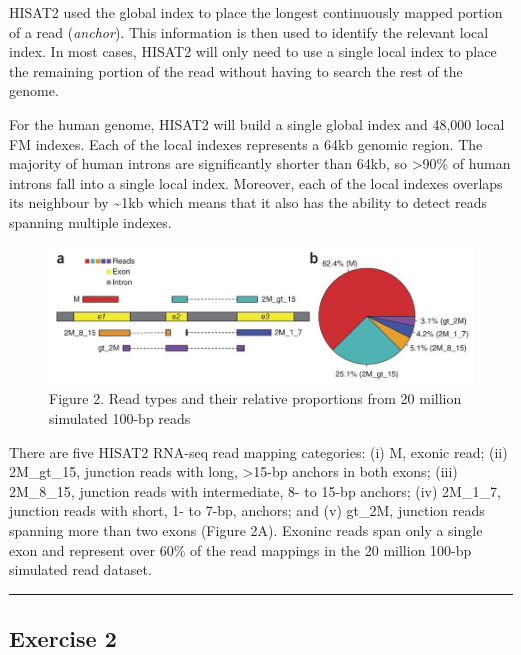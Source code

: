 \documentclass[11pt]{article}
\begin{document}
HISAT2 used the global index to place the longest continuously mapped
portion of a read (\textit{anchor}). This information is then used to
identify the relevant local index. In most cases, HISAT2 will only need
to use a single local index to place the remaining portion of the read
without having to search the rest of the genome.

For the human genome, HISAT2 will build a single global index and 48,000
local FM indexes. Each of the local indexes represents a 64kb genomic
region. The majority of human introns are significantly shorter than
64kb, so \textgreater90\% of human introns fall into a single local
index. Moreover, each of the local indexes overlaps its neighbour by
\textasciitilde1kb which means that it also has the ability to detect
reads spanning multiple indexes.

    \begin{figure}[!h]
\centering
\includegraphics{images/split-reads.png}
\caption{Figure 2. Read types and their relative proportions from 20
million simulated 100-bp reads}
\end{figure}

    There are five HISAT2 RNA-seq read mapping categories: (i) M, exonic
read; (ii) 2M\_gt\_15, junction reads with long, \textgreater15-bp
anchors in both exons; (iii) 2M\_8\_15, junction reads with
intermediate, 8- to 15-bp anchors; (iv) 2M\_1\_7, junction reads with
short, 1- to 7-bp, anchors; and (v) gt\_2M, junction reads spanning more
than two exons (Figure 2A). Exoninc reads span only a single exon and
represent over 60\% of the read mappings in the 20 million 100-bp
simulated read dataset.

    \begin{center}\rule{0.5\linewidth}{0.5pt}\end{center}

    \hypertarget{exercise-2}{%
\subsection{Exercise 2}\label{exercise-2}}
\end{document}
